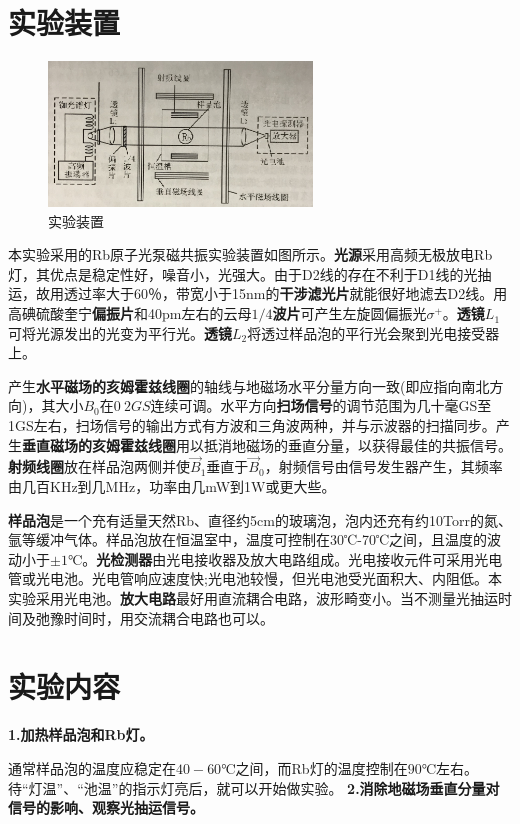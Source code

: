 \documentclass[UTF8]{ctexart}
\begin{document}
\begin{multicols}{2}
\section{实验装置}
\begin{figure}[H]
\centering
\includegraphics[width=7cm]{lightroot}
\caption{\small{实验装置}}
\end{figure}
本实验采用的Rb原子光泵磁共振实验装置如图所示。\textbf{光源}采用高频无极放电Rb灯，其优点是稳定性好，噪音小，光强大。由于D2线的存在不利于D1线的光抽运，故用透过率大于60％，带宽小于15nm的\textbf{干涉滤光片}就能很好地滤去D2线。用高碘硫酸奎宁\textbf{偏振片}和40pm左右的云母\textbf{$1/4$波片}可产生左旋圆偏振光$\sigma^+$。\textbf{透镜$L_1$}可将光源发出的光变为平行光。\textbf{透镜$L_2$}将透过样品泡的平行光会聚到光电接受器上。

产生\textbf{水平磁场的亥姆霍兹线圈}的轴线与地磁场水平分量方向一致(即应指向南北方向)，其大小$B_0$在$0~2GS$连续可调。水平方向\textbf{扫场信号}的调节范围为几十毫GS至1GS左右，扫场信号的输出方式有方波和三角波两种，并与示波器的扫描同步。产生\textbf{垂直磁场的亥姆霍兹线圈}用以抵消地磁场的垂直分量，以获得最佳的共振信号。\textbf{射频线圈}放在样品泡两侧并使$\vec{B}_{1}$垂直于$\vec{B}_{0}$，射频信号由信号发生器产生，其频率由几百KHz到几MHz，功率由几mW到1W或更大些。

\textbf{样品泡}是一个充有适量天然Rb、直径约5cm的玻璃泡，泡内还充有约10Torr的氮、氩等缓冲气体。样品泡放在恒温室中，温度可控制在30℃-70℃之间，且温度的波动小于$\pm1℃$。\textbf{光检测器}由光电接收器及放大电路组成。光电接收元件可采用光电管或光电池。光电管响应速度快;光电池较慢，但光电池受光面积大、内阻低。本实验采用光电池。\textbf{放大电路}最好用直流耦合电路，波形畸变小。当不测量光抽运时间及弛豫时间时，用交流耦合电路也可以。

\section{实验内容}
\noindent\textbf{1.加热样品泡和Rb灯。}

通常样品泡的温度应稳定在$40-60℃$之间，而Rb灯的温度控制在$90℃$左右。待“灯温”、“池温”的指示灯亮后，就可以开始做实验。
\newline\textbf{2.消除地磁场垂直分量对信号的影响、观察光抽运信号。}


\end{multicols}
\end{document}
